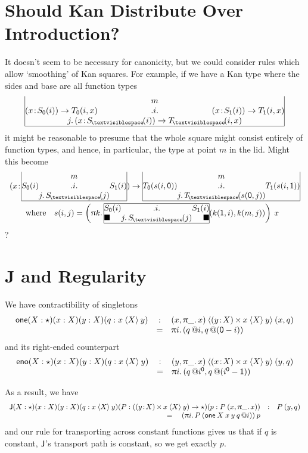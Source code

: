 \documentclass{article}
\makeatletter
\newcommand{\F}[1]{\green{\mathsf{#1}}}
\newcommand{\hb}{\!:\!}
\newcommand{\TY}{\blue{\star}}
\newcommand{\TO}{\mathrel{\blue{\to}}}
\newcommand{\PI}[2]{\blue{(}#1\hb #2\blue{)\to\;}}
\newcommand{\SG}[2]{\blue{(}#1\hb #2\blue{)\,\times\,}}
\newcommand{\PATH}[3]{#2\mathbin{\blue{\langle}#1\blue{\rangle}}#3}
\newcommand{\pr}{\red{,}\,}
\newcommand{\pa}[1]{\red{\uppi}#1.\,}
\newcommand{\ze}{{\orange{\mathsf{0}}}}
\newcommand{\un}{{\orange{\mathsf{1}}}}
\newcommand{\base}{{\!\orange{\textvisiblespace}\!}}
\newcommand{\mux}[3]{#1\orange{(}#2\orange{,}\,#3\orange{)}}
\newcommand{\pj}{\,\orange{@}}
\newcommand{\KAN}[6]{\blue{\begin{array}{|@{}r@{}c@{}l@{}|}
                        & \black{#6} & \\
                     \black{#2} & \black{.#1.} & \black{#3} \\
                        & \black{#4.\,#5} & \\
                      \hline
                     \end{array}}}
\newcommand{\ikan}[7]{\red{\begin{array}{|@{}r@{}c@{}l@{}|}
                        \hline
                     \black{#2} & \black{.#1.} & \black{#3} \\
                        \red{\blacksquare}\hfill & \black{#4.\,#5} & \hfill\red{\blacksquare} \\
                      \hline
                     \end{array}}(#6,#7)}
\makeatother
\begin{document}
\section{Should Kan Distribute Over Introduction?}

It doesn't seem to be necessary for canonicity, but we could consider
rules which allow `smoothing' of Kan squares. For example, if we have
a Kan type where the sides and base are all function types
\[
\KAN i{\PI x{S_\ze(i)}T_\ze(i,x)\hspace*{-0.5in}}
      {\hspace*{-0.5in}\PI x{S_\un(i)}T_\un(i,x)}
     j{\PI x{S_\base(i)}T_\base(i,x)}m
\]
it might be reasonable to presume that the whole square might consist
entirely of function types, and hence, in particular, the type at
point $m$ in the lid. Might this become
\[\begin{array}{l}
\PI x{\KAN i{S_\ze(i)}{S_\un(i)}j{S_\base(j)}m}
     {\KAN i{T_\ze(s(i,\ze))}{T_\un(s(i,\un))}j{T_\base(s(\ze,j))}m}
\smallskip\\ \qquad \mbox{where}\quad
  s(i,j) = \left(\pa k \ikan
    i{S_\ze(i)}{S_\un(i)}j{S_\base(j)}{\mux k\un i}{\mux kmj}\right)\:x
\end{array}\]
?



\section{J and Regularity}

We have contractibility of singletons
\[\begin{array}{rcl}
\F{one}(X:\TY)(x:X)(y:X)(q:\PATH Xxy) & : &
  \PATH{\SG yX\PATH Xxy}{(x\pr\pa\_x)}{(x\pr q)} \\
&=& \pa i (q\pj i\pr q\pj{(\ze-i)})
\end{array}\]
and its right-ended counterpart
\[\begin{array}{rcl}
\F{eno}(X:\TY)(x:X)(y:X)(q:\PATH Xxy) & : &
  \PATH{\SG xX\PATH Xxy}{(y\pr\pa\_x)}{(y\pr q)} \\
&=& \pa i (q\pj i^\ze\pr q\pj{(i^\ze-\un)})
\end{array}\]

As a result, we have
\[\begin{array}{rcl}
\F{J}(X:\TY)(x:X)(y:X)(q:\PATH Xxy)(P:(\SG yX\PATH Xxy)\TO\TY)
   (p:P\:(x\pr\pa\_x))  & : & P\:(y\pr q) \\
 = \quad (\pa i P\:(\F{one}\:X\:x\:y\:q \pj i))\:p
\end{array}\]
and our rule for transporting across constant functions gives us that
if $q$ is constant, $\F{J}$'s transport path is constant, so we get exactly $p$.
\end{document}
